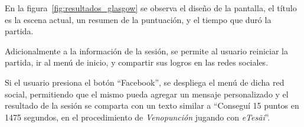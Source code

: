 En la figura~\ref{fig:resultados_glasgow} se observa el diseño de la
pantalla, el título es la escena actual, un resumen de la
puntuación, y el tiempo que duró la partida.

Adicionalmente a la información de la sesión, se permite al usuario reiniciar la
partida, ir al menú de inicio, y compartir sus logros en las redes sociales.

Si el usuario presiona el botón \enquote{Facebook}, se despliega el menú de
dicha red social, permitiendo que el mismo pueda agregar un mensaje
personalizado y el resultado de la sesión se comparta con un texto similar a
\enquote{Conseguí 15 puntos en 1475 segundos, en el procedimiento de
    \emph{Venopunción} jugando con \textit{eTes\~{a}i}}.

